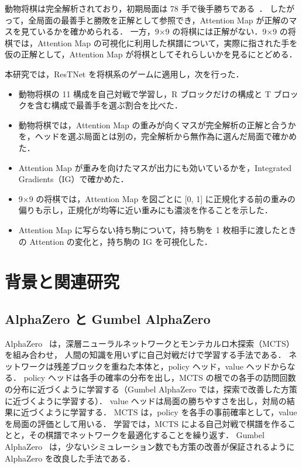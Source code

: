 \documentclass[submit]{ipsj}
\begin{document}
動物将棋は完全解析されており，初期局面は 78 手で後手勝ちである~\cite{tanaka2009}．
したがって，全局面の最善手と勝敗を正解として参照でき，Attention Map が正解のマスを見ているかを確かめられる．
一方，9×9 の将棋には正解がない．9×9 の将棋では，Attention Map の可視化に利用した棋譜について，実際に指された手を仮の正解として，Attention Map が将棋としてそれらしいかを見るにとどめる．

本研究では，ResTNet を将棋系のゲームに適用し，次を行った．
    \begin{itemize}
        \item 動物将棋の 11 構成を自己対戦で学習し，R ブロックだけの構成と T ブロックを含む構成で最善手を選ぶ割合を比べた．
        \item 動物将棋では，Attention Map の重みが向くマスが完全解析の正解と合うかを，ヘッドを選ぶ局面とは別の，完全解析から無作為に選んだ局面で確かめた．
        \item Attention Map が重みを向けたマスが出力にも効いているかを，Integrated Gradients（IG）で確かめた．
        \item 9×9 の将棋では，Attention Map を図ごとに [0, 1] に正規化する前の重みの偏りも示し，正規化が均等に近い重みにも濃淡を作ることを示した．
        \item Attention Map に写らない持ち駒について，持ち駒を 1 枚相手に渡したときの Attention の変化と，持ち駒の IG を可視化した．
    \end{itemize}

\section{背景と関連研究}
\subsection{AlphaZero と Gumbel AlphaZero}
AlphaZero~\cite{alphazero} は，深層ニューラルネットワークとモンテカルロ木探索（MCTS）を組み合わせ，
人間の知識を用いずに自己対戦だけで学習する手法である．
ネットワークは残差ブロックを重ねた本体と，policy ヘッド，value ヘッドからなる．
policy ヘッドは各手の確率の分布を出し，MCTS の根での各手の訪問回数の分布に近づくように学習する（Gumbel AlphaZero では，探索で改善した方策に近づくように学習する）．
value ヘッドは局面の勝ちやすさを出し，対局の結果に近づくように学習する．
MCTS は，policy を各手の事前確率として，value を局面の評価として用いる．
学習では，MCTS による自己対戦で棋譜を作ることと，その棋譜でネットワークを最適化することを繰り返す．
Gumbel AlphaZero~\cite{gumbel} は，少ないシミュレーション数でも方策の改善が保証されるように AlphaZero を改良した手法である．
\end{document}
